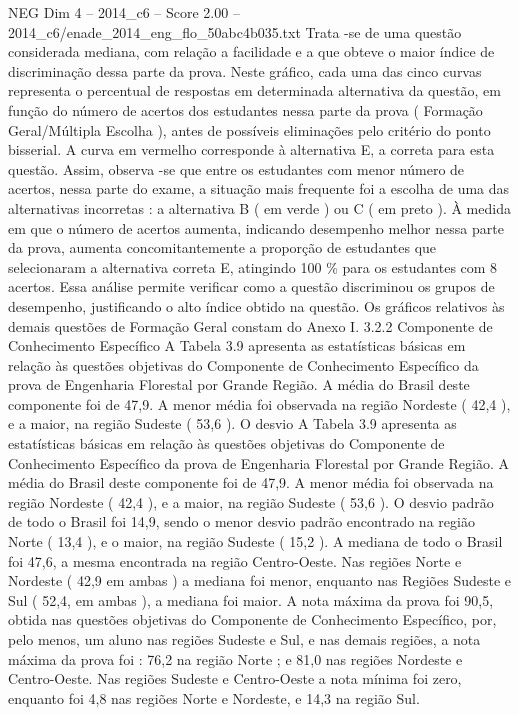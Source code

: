 \begin{textsample}{NEG Dim 4 – 2014\_c6 – Score 2.00 – 2014\_c6/enade\_2014\_eng\_flo\_50abc4b035.txt}
Trata -se de uma questão considerada mediana, com relação a facilidade e a que obteve o maior índice de discriminação dessa parte da prova.
Neste gráfico, cada uma das cinco curvas representa o percentual de respostas em determinada alternativa da questão, em função do número de acertos dos estudantes nessa parte da prova ( Formação Geral/Múltipla Escolha ), antes de possíveis eliminações pelo critério do ponto bisserial.
A curva em vermelho corresponde à alternativa E, a correta para esta questão.
Assim, observa -se que entre os estudantes com menor número de acertos, nessa parte do exame, a situação mais frequente foi a escolha de uma das alternativas incorretas : a alternativa B ( em verde ) ou C ( em preto ).
À medida em que o número de acertos aumenta, indicando desempenho melhor nessa parte da prova, aumenta concomitantemente a proporção de estudantes que selecionaram a alternativa correta E, atingindo 100 \% para os estudantes com 8 acertos.
Essa análise permite verificar como a questão discriminou os grupos de desempenho, justificando o alto índice obtido na questão.
Os gráficos relativos às demais questões de Formação Geral constam do Anexo I. 3.2.2 Componente de Conhecimento Específico A Tabela 3.9 apresenta as estatísticas básicas em relação às questões objetivas do Componente de Conhecimento Específico da prova de Engenharia Florestal por Grande Região.
A média do Brasil deste componente foi de 47,9.
A menor média foi observada na região Nordeste ( 42,4 ), e a maior, na região Sudeste ( 53,6 ).
O desvio A Tabela 3.9 apresenta as estatísticas básicas em relação às questões objetivas do Componente de Conhecimento Específico da prova de Engenharia Florestal por Grande Região.
A média do Brasil deste componente foi de 47,9.
A menor média foi observada na região Nordeste ( 42,4 ), e a maior, na região Sudeste ( 53,6 ).
O desvio padrão de todo o Brasil foi 14,9, sendo o menor desvio padrão encontrado na região Norte ( 13,4 ), e o maior, na região Sudeste ( 15,2 ).
A mediana de todo o Brasil foi 47,6, a mesma encontrada na região Centro-Oeste.
Nas regiões Norte e Nordeste ( 42,9 em ambas ) a mediana foi menor, enquanto nas Regiões Sudeste e Sul ( 52,4, em ambas ), a mediana foi maior.
A nota máxima da prova foi 90,5, obtida nas questões objetivas do Componente de Conhecimento Específico, por, pelo menos, um aluno nas regiões Sudeste e Sul, e nas demais regiões, a nota máxima da prova foi : 76,2 na região Norte ; e 81,0 nas regiões Nordeste e Centro-Oeste.
Nas regiões Sudeste e Centro-Oeste a nota mínima foi zero, enquanto foi 4,8 nas regiões Norte e Nordeste, e 14,3 na região Sul.

\end{textsample}
